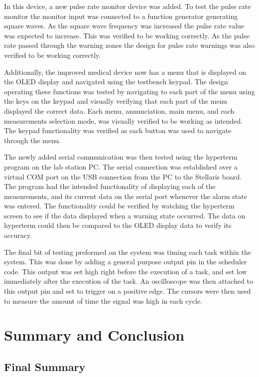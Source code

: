 \documentclass[12pt]{article} %
\begin{document}
    In this device, a new pulse rate monitor device was added. To test the
    pulse rate monitor  the monitor input was connected to a function generator
    generating square waves. As the square wave frequency was increased the
    pulse rate value was expected to increase. This was verified to be working
    correctly. As the pulse rate passed through the warning zones the design
    for pulse rate warnings was also verified to be working correctly.
    
    Additionally, the improved medical device now has a menu that is displayed
    on the OLED display and navigated using the testbench keypad. The design
    operating these functions was tested by navigating to each part of the menu
    using the keys on the keypad and visually verifying that each part of the
    menu displayed the correct data. Each menu, annunciation, main menu, and
    each measurements selection mode, was visually verified to be working as
    intended. The keypad functionality was verified as each button was used to
    navigate through the menu.
    
    The newly added serial communication was then tested using the hyperterm
    program on the lab station PC. The serial connection was established over a
    virtual COM port on the USB connection from the PC to the Stellaris board.
    The program had the intended functionality of displaying each of the
    measurements, and its current data on the serial port whenever the alarm
    state was entered. The functionality could be verified by watching the
    hyperterm screen to see if the data displayed when a warning state occurred.
    The data on hyperterm could then be compared to the OLED display data to
    verify its accuracy. 
    
    The final bit of testing preformed on the system was timing each task within
    the system. This was done by adding a general purpose output pin in the
    scheduler code. This output was set high right before the execution of a task,
    and set low immediately after the execution of the task. An oscilloscope was
    then attached to this output pin and set to trigger on a positive edge. The
    cursors were then used to measure the amount of time the signal was high in
    each cycle.


    \section{Summary and Conclusion}

    \subsection{Final Summary} 
\end{document}
